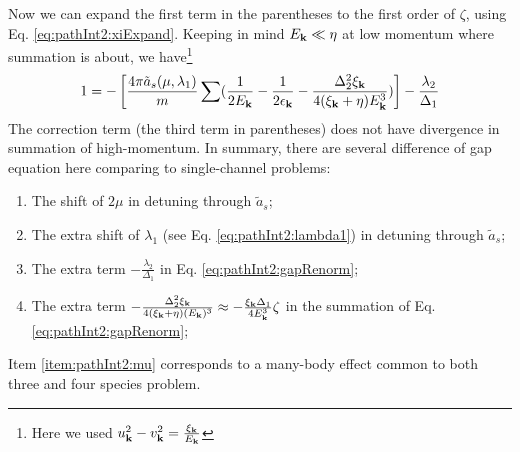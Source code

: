 Now we can expand the first term in the parentheses to the first order of $\zeta$, using Eq. \ref{eq:pathInt2:xiExpand}. Keeping in mind $E_{\mathbf{k}}\ll{\eta}$ at low momentum where summation is about, we have\footnote{Here we used $u_{\mathbf{k}}^{2}-v_{\mathbf{k}}^{2}=\frac{\xi_{\mathbf{k}}}{E_{\mathbf{k}}}$}
\begin{equation}\label{eq:pathInt2:gapRenorm}
1=-\left[\frac{4\pi{\tilde{a}_{s}(\mu,\lambda_{1})}}{m}\sum(\frac{1}{2E_{\mathbf{k}}}-\frac{1}{2\epsilon_{\mathbf{k}}}-\frac{\Delta_{2}^{2}\xi_{\mathbf{k}}}{4(\xi_{\mathbf{k}}+\eta){E_{\mathbf{k}}^{3}}})\right]
	-\frac{\lambda_{2}}{\Delta_{1}}
\end{equation}
The correction term (the third term in parentheses) does not have divergence in summation of high-momentum. 
In summary, there are several difference of gap equation here comparing to single-channel problems:
\begin{enumerate}
\item\label{item:pathInt2:mu}The shift of $2\mu$ in detuning through $\tilde{a}_{s}$;
\item The extra shift of $\lambda_{1}$ (see Eq. \ref{eq:pathInt2:lambda1}) in detuning through $\tilde{a}_{s}$;
\item The extra term $-\frac{\lambda_{2}}{\Delta_{1}}$ in Eq. \ref{eq:pathInt2:gapRenorm};
\item The extra term $-\frac{\Delta_{2}^{2}\xi_{\mathbf{k}}}{4(\xi_{\mathbf{k}}+\eta){(E_{\mathbf{k}})^{3}}}\approx-\frac{\xi_{\mathbf{k}}\Delta_{1}}{4{E_{\mathbf{k}}^{3}}}\zeta$ in the summation of Eq. \ref{eq:pathInt2:gapRenorm};
\end{enumerate}
Item \ref{item:pathInt2:mu} corresponds to a many-body effect  common to both three and four species problem.
